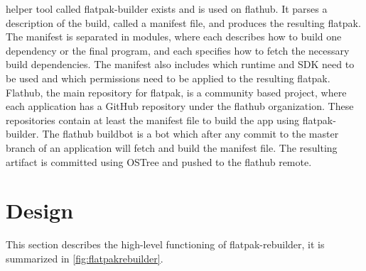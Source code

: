 \documentclass[a4paper,11pt,oneside]{report}
\theoremstyle{definition}
\newcommand{\sysname}{flatpak-rebuilder\xspace}
\newcommand{\fp}{flatpak\xspace}
\newcommand{\fh}{flathub\xspace}
\newcommand{\fb}{flatpak-builder\xspace}
\newcommand{\fhbb}{flathub buildbot\xspace}
\newcommand{\ot}{OSTree\xspace}
\begin{document}
helper tool called \fb exists and is used on \fh. It parses a description of
the build, called a manifest file, and produces the resulting \fp. The manifest
is separated in modules, where each describes how to build one dependency or
the final program, and each specifies how to fetch the necessary build
dependencies. The manifest also includes which runtime and SDK need to be used
and which permissions need to be applied to the resulting \fp. Flathub, the
main repository for \fp, is a community based project, where each application
has a GitHub repository under the \fh organization. These repositories contain
at least the manifest file to build the app using \fb. The \fhbb is a bot which
after any commit to the master branch of an application will fetch and build
the manifest file. The resulting artifact is committed using \ot and pushed to
the \fh remote.


\chapter{Design}
\label{chap:design}

This section describes the high-level functioning of \sysname, it is summarized
in \autoref{fig:flatpakrebuilder}.
\end{document}
